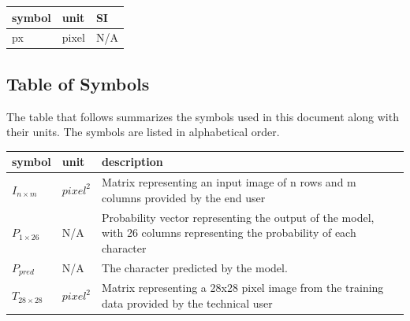 \documentclass[12pt]{article}
\begin{document}
\renewcommand{\arraystretch}{1.2}
  \noindent \begin{tabular}{l l l} 
    \toprule		
    \textbf{symbol} & \textbf{unit} & \textbf{SI}\\
    \midrule 
    px & pixel & N/A \\
    \bottomrule
  \end{tabular}




\subsection{Table of Symbols}

The table that follows summarizes the symbols used in this document along with
their units. The symbols are listed in alphabetical order.

\renewcommand{\arraystretch}{1.2}
\noindent \begin{longtable*}{l l p{12cm}} \toprule
\textbf{symbol} & \textbf{unit} & \textbf{description}\\
\midrule
$I_{n \times m}$ & ${pixel^2}$ & Matrix representing an input image of n rows
and m columns provided by the end user
\\
$P_{1 \times 26}$ & N/A & Probability vector representing the output of the
model, with 26 columns representing the probability of each character
\\
$P_{pred}$ & N/A & The character predicted by the model.
\\ 
$T_{28 \times 28}$ & ${pixel^2}$ & Matrix representing a 28x28 pixel image from
the training data provided by the technical user
\\
\bottomrule
\end{longtable*}
\end{document}
